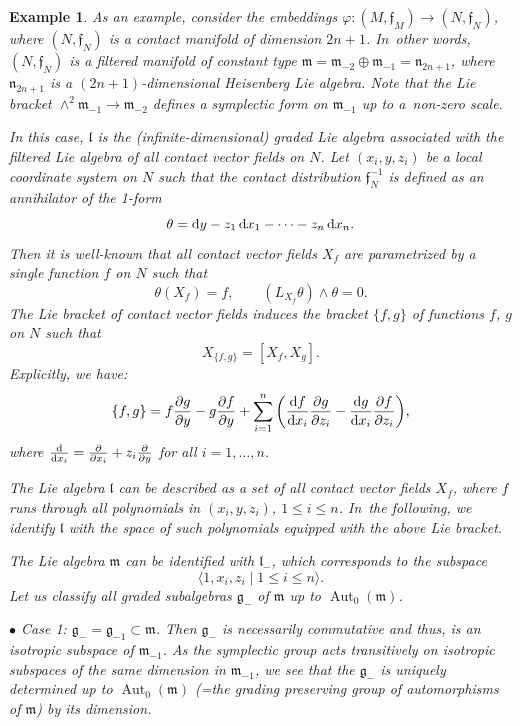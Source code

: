 \documentclass[pdftex]{sigma}%
\newcommand{\f}{\mathfrak f}
\newcommand{\g}{\mathfrak g}
\newcommand{\lf}{\mathfrak l}
\newcommand{\m}{\mathfrak m}
\newcommand{\n}{\mathfrak n}
\newcommand{\Aut}{\operatorname{Aut}}
\newtheorem{ex}[thm]{Example}
\numberwithin{equation}{section}
\begin{document}
\begin{ex}
	As an example, consider the embeddings $\varphi\colon (M,\f_M)\to (N,\f_N)$, where $(N,\f_N)$ is a contact manifold of dimension $2n+1$. In~other words, $(N,\f_N)$ is a filtered manifold of constant type $\m=\m_{-2}\oplus\m_{-1}=\n_{2n+1}$, where $\n_{2n+1}$ is a $(2n+1)$-dimensional Heisenberg Lie algebra. Note that the Lie bracket $\wedge^2 \m_{-1}\to \m_{-2}$ defines a symplectic form on $\m_{-1}$ up to a~non-zero scale.
	
	In this case, $\lf$ is the (infinite-dimensional) graded Lie algebra associated with the filtered Lie algebra of all contact vector fields on $N$. Let $(x_i,y,z_i)$ be a local coordinate system on $N$ such that the contact distribution $\f_{N}^{-1}$ is defined as an annihilator of the 1-form
	\[
	\theta = {\rm d}y - z_1\,{\rm d}x_1 - \dots - z_n\,{\rm d}x_n.
	\]
	Then it is well-known that all contact vector fields $X_f$ are parametrized by a single function $f$ on $N$ such that
	\[
	\theta(X_f)=f,\qquad (L_{X_f} \theta)\wedge \theta = 0.
	\]
	The Lie bracket of contact vector fields induces the bracket $\{f,g\}$ of functions $f$, $g$ on $N$ such that
	\[
	X_{\{f,g\}} = [X_f,X_g].
	\]
	Explicitly, we have:
	\[
	\{f,g\} = f\frac{\partial g}{\partial y} - g\frac{\partial f}{\partial y} +
	\sum_{i=1}^n \bigg(\frac{{\rm d}f}{{\rm d}x_i}\frac{\partial g}{\partial z_i} - \frac{{\rm d}g}{{\rm d}x_i}\frac{\partial f}{\partial z_i} \bigg),
	\]
	where $\frac{\rm d}{{\rm d}x_i} = \frac{\partial}{\partial x_i} + z_i \frac{\partial}{\partial y}$
for all $i=1,\dots, n$.
	
	The Lie algebra $\lf$ can be described as a set of all contact vector fields $X_f$, where $f$ runs through all polynomials in $(x_i,y,z_i)$, $1\le i\le n$. In~the following, we identify $\lf$ with the space of such polynomials equipped with the above Lie bracket.
	
	The Lie algebra $\m$ can be identified with $\lf_{-}$, which corresponds to the subspace
	\[
	\langle 1, x_i, z_i\mid 1\le i \le n \rangle.
	\]
	Let us classify all graded subalgebras $\g_{-}$ of $\m$ up to $\Aut_0(\m)$.
	
$\bullet$ {\it Case} 1: $\g_{-}=\g_{-1}\subset \m$. Then $\g_{-}$ is necessarily commutative and thus, is an isotropic subspace of $\m_{-1}$. As the symplectic group acts transitively on isotropic subspaces of the same dimension in $\m_{-1}$, we see that the $\g_{-}$ is uniquely determined up to $\Aut_0(\m)$ (=the grading preserving group of automorphisms of $\m$) by its dimension.
	

\end{ex}
\end{document}

